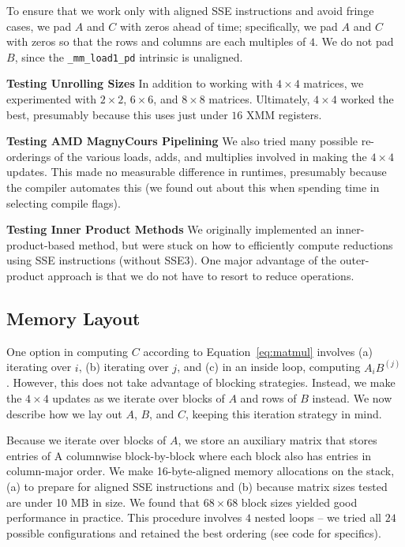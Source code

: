 \documentclass{article} %
\begin{document}
To ensure that we work only with aligned SSE instructions and avoid fringe
cases, we pad $A$ and $C$ with zeros ahead of time; specifically, we pad
$A$ and $C$ with zeros so that the rows and columns are each multiples of $4$.
We do not pad $B$, since the \texttt{\_mm\_load1\_pd} intrinsic is unaligned.

\textbf{Testing Unrolling Sizes} In addition to working with $4\times 4$ matrices, we
experimented with $2\times 2$, $6\times 6$, and $8\times 8$ matrices.
Ultimately, $4\times 4$ worked the best, presumably because this uses just under
$16$ XMM registers.

\textbf{Testing AMD MagnyCours Pipelining} We also tried many possible
re-orderings of the various loads, adds, and multiplies involved in making the
$4\times 4$ updates. This made no measurable difference in runtimes, presumably
because the compiler automates this (we found out about this when spending time
in selecting compile flags).

\textbf{Testing Inner Product Methods} We originally implemented an
inner-product-based method, but were stuck on how to efficiently compute
reductions using SSE instructions (without SSE3). One major advantage of the
outer-product approach is that we do not have to resort to reduce operations.

\subsection{Memory Layout}
One option in computing $C$ according to Equation~\eqref{eq:matmul} involves
(a) iterating over $i$, (b) iterating over $j$, and (c) in an inside loop,
computing $A_i B^{(j)}$. However, this does not take advantage of blocking
strategies. Instead, we make the $4\times 4$ updates as we iterate
over blocks of $A$ and rows of $B$ instead. We now describe how we lay out $A$,
$B$, and $C$, keeping this iteration strategy in mind.

Because we iterate over blocks of $A$, we store an
auxiliary matrix that stores entries of A columnwise block-by-block where each
block also has entries in column-major order. We make 16-byte-aligned memory
allocations on the stack, (a) to prepare for aligned SSE instructions and (b)
because matrix sizes tested are under 10 MB in size. We found that $68\times 68$
block sizes yielded good performance in practice. This procedure involves $4$
nested loops -- we tried all $24$ possible configurations and retained the best
ordering (see code for specifics).
\end{document}
